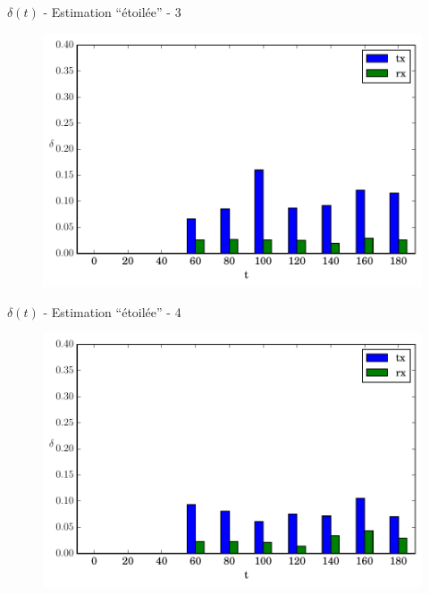 \begin{frame}{$\delta(t)$ - Estimation ``étoilée'' - 3}
  \begin{figure}
    \centering  
    \includegraphics[width=\textwidth]{figures/evolution_noinfo_3.pdf}
  \end{figure}
\end{frame}

\begin{frame}{$\delta(t)$ - Estimation ``étoilée'' - 4}
  \begin{figure}
    \centering  
    \includegraphics[width=\textwidth]{figures/evolution_noinfo_4.pdf}
  \end{figure}
\end{frame}

